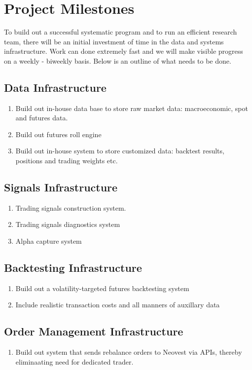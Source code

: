 \documentclass{article}
\begin{document}
\section{Project Milestones}
To build out a successful systematic program and to run an efficient research team, there will be an initial investment of time in the data and systems infrastructure.
Work can done extremely fast and we will make visible progress on a weekly - biweekly basis. Below is an outline of what needs to be done. 
\newpage
\subsection{Data Infrastructure}
\begin{enumerate}
\item Build out in-house data base to store raw market data: macroeconomic, spot and futures data. 
\item Build out futures roll engine
\item Build out in-house system to store customized data: backtest results, positions and trading weights etc.
\end{enumerate}

\subsection{Signals Infrastructure}
\begin{enumerate}
\item Trading signals construction system.
\item Trading signals diagnostics system 
\item Alpha capture system
\end{enumerate}

\subsection{Backtesting Infrastructure}
\begin{enumerate}
\item Build out a volatility-targeted futures backtesting system
\item Include realistic transaction costs and all manners of auxillary data
\end{enumerate}


\subsection{Order Management Infrastructure}
\begin{enumerate}
\item Build out system that sends rebalance orders to Neovest via APIs, thereby eliminaating need for dedicated trader.
\end{enumerate}
\end{document}
